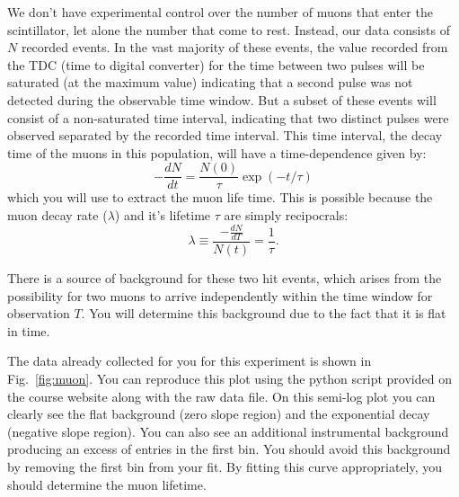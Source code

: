 \documentclass[12pt]{article}
\begin{document}
We don't have experimental control over the number of muons that enter the scintillator, let alone the number that come to rest.   Instead, our data consists of $N$ recorded events.  In the vast majority of these events, the value recorded from the TDC (time to digital converter) for the time between two pulses will be saturated (at the maximum value) indicating that a second pulse was not detected during the observable time window.  But a subset of these events will consist of a non-saturated time interval, indicating that two distinct pulses were observed separated by the recorded time interval.  This time interval, the decay time of the muons in this population, will have a time-dependence given by:
\begin{displaymath}
-\frac{dN}{dt} = \frac{N(0)}{\tau} \exp(-t/\tau)
\end{displaymath}
which you will use to extract the muon life time.  This is possible because the muon decay rate ($\lambda$)
and it's lifetime $\tau$ are simply recipocrals:
\begin{displaymath}
\lambda \equiv \frac{-\frac{dN}{dT}}{N(t)} = \frac{1}{\tau}.
\end{displaymath}

There is a source of background for these two hit events, which arises from the possibility for two muons to arrive independently within the time window for observation $T$.  You will determine this background due to the fact that it is flat in time.


The data already collected for you for this experiment is shown in Fig.~\ref{fig:muon}.  You can reproduce this plot using the python script provided on the course website along with the raw data file.  On this semi-log plot you can clearly see the flat background (zero slope region) and the exponential decay (negative slope region).  You can also see an additional instrumental background producing an excess of entries in the first bin.  You should avoid this background by removing the first bin from your fit.  By fitting this curve appropriately, you should determine the muon lifetime.
\end{document}
